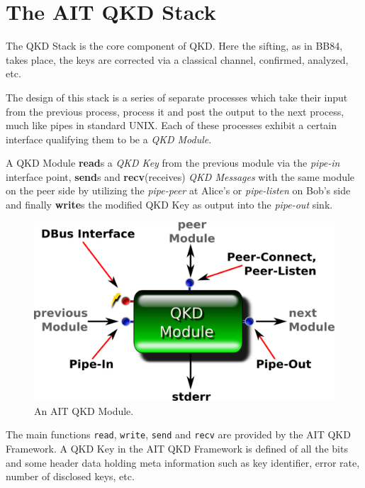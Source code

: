 \chapter{The AIT QKD Stack}
\label{chap:The AIT QKD Stack}

The QKD Stack is the core component of QKD. Here the sifting, as in BB84, takes place, the keys are corrected via a classical channel, confirmed, analyzed, etc.

\medskip

The design of this stack is a series of separate processes which take their input from the previous process, process it and post the output to the next process, much like pipes in standard UNIX. Each of these processes exhibit a certain interface qualifying them to be a \emph{QKD Module}.

\medskip

A QKD Module \textbf{read}s a \emph{QKD Key} from the previous module via the \emph{pipe-in} interface point, \textbf{send}s and \textbf{recv}(receives) \emph{QKD Messages} with the same module on the peer side by utilizing the \emph{pipe-peer} at Alice's or \emph{pipe-listen} on Bob's side and finally \textbf{write}s the modified QKD Key as output into the \emph{pipe-out} sink.

\medskip

\begin{figure}[h]
    \centering
    \includegraphics{./gfx/qkd-module.png}
    \caption{An AIT QKD Module.}
    \label{fig:qkd-module}
\end{figure}

The main functions \texttt{read}, \texttt{write}, \texttt{send} and \texttt{recv} are provided by the AIT QKD Framework. A QKD Key in the AIT QKD Framework is defined of all the bits and some header data holding meta information such as key identifier, error rate, number of disclosed keys, etc.

